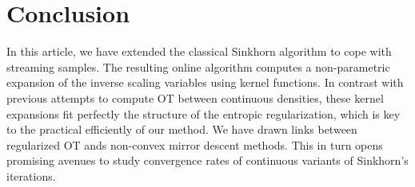 
\section{Conclusion}

In this article, we have extended the classical Sinkhorn algorithm to cope with streaming samples. The resulting online algorithm computes a non-parametric expansion of the inverse scaling variables using kernel functions. In contrast with previous attempts to compute OT between continuous densities, these kernel expansions fit perfectly the structure of the entropic regularization, which is key to the practical efficiently of our method. 
%
We have drawn links between regularized OT ands non-convex mirror descent methods. This in turn opens promising avenues to study convergence rates of continuous variants of Sinkhorn's iterations.
\vfill